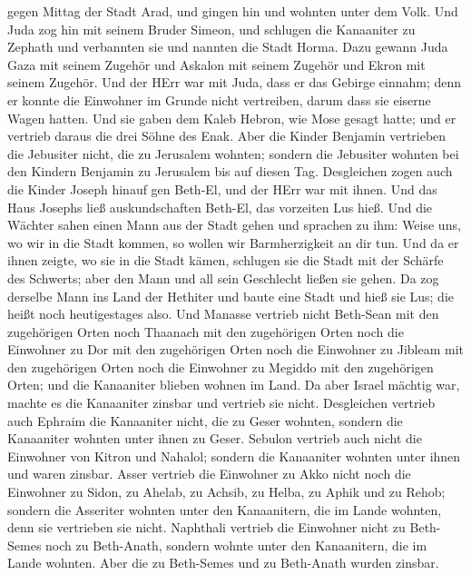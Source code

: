 gegen Mittag der Stadt Arad, und gingen hin und wohnten unter dem Volk.
 Und Juda zog hin mit seinem Bruder Simeon, und schlugen
die Kanaaniter zu Zephath und verbannten sie und nannten die Stadt
Horma.  Dazu gewann Juda Gaza mit seinem Zugehör und
Askalon mit seinem Zugehör und Ekron mit seinem Zugehör. 
Und der HErr war mit Juda, dass er das Gebirge einnahm; denn er konnte
die Einwohner im Grunde nicht vertreiben, darum dass sie eiserne Wagen
hatten.  Und sie gaben dem Kaleb Hebron, wie Mose gesagt
hatte; und er vertrieb daraus die drei Söhne des Enak. 
Aber die Kinder Benjamin vertrieben die Jebusiter nicht, die zu
Jerusalem wohnten; sondern die Jebusiter wohnten bei den Kindern
Benjamin zu Jerusalem bis auf diesen Tag.  Desgleichen
zogen auch die Kinder Joseph hinauf gen Beth-El, und der HErr war mit
ihnen.  Und das Haus Josephs ließ auskundschaften Beth-El,
das vorzeiten Lus hieß.  Und die Wächter sahen einen Mann
aus der Stadt gehen und sprachen zu ihm: Weise uns, wo wir in die Stadt
kommen, so wollen wir Barmherzigkeit an dir tun.  Und da er
ihnen zeigte, wo sie in die Stadt kämen, schlugen sie die Stadt mit der
Schärfe des Schwerts; aber den Mann und all sein Geschlecht ließen sie
gehen.  Da zog derselbe Mann ins Land der Hethiter und
baute eine Stadt und hieß sie Lus; die heißt noch heutigestages also.
 Und Manasse vertrieb nicht Beth-Sean mit den zugehörigen
Orten noch Thaanach mit den zugehörigen Orten noch die Einwohner zu Dor
mit den zugehörigen Orten noch die Einwohner zu Jibleam mit den
zugehörigen Orten noch die Einwohner zu Megiddo mit den zugehörigen
Orten; und die Kanaaniter blieben wohnen im Land.  Da aber
Israel mächtig war, machte es die Kanaaniter zinsbar und vertrieb sie
nicht.  Desgleichen vertrieb auch Ephraim die Kanaaniter
nicht, die zu Geser wohnten, sondern die Kanaaniter wohnten unter ihnen
zu Geser.  Sebulon vertrieb auch nicht die Einwohner von
Kitron und Nahalol; sondern die Kanaaniter wohnten unter ihnen und waren
zinsbar.  Asser vertrieb die Einwohner zu Akko nicht noch
die Einwohner zu Sidon, zu Ahelab, zu Achsib, zu Helba, zu Aphik und zu
Rehob;  sondern die Asseriter wohnten unter den
Kanaanitern, die im Lande wohnten, denn sie vertrieben sie nicht.
 Naphthali vertrieb die Einwohner nicht zu Beth-Semes noch
zu Beth-Anath, sondern wohnte unter den Kanaanitern, die im Lande
wohnten. Aber die zu Beth-Semes und zu Beth-Anath wurden zinsbar.

